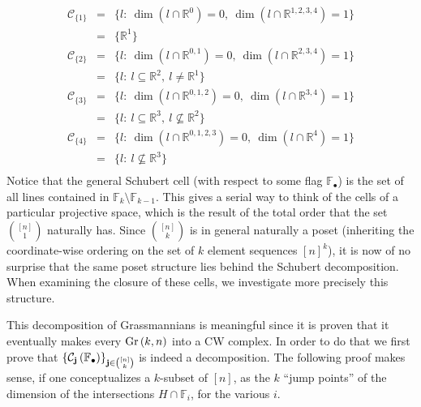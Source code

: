 \[\begin{array}{rcl}
\mathcal{C}_{\{1\}}&=&\big\{l:\ \dim(l\cap\mathbb{R}^{0})=0,\ \dim(l\cap\mathbb{R}^{1,2,3,4})=1\big\}\\
&=&\big\{\mathbb{R}^1\big\}\\[.6em]
\mathcal{C}_{\{2\}}&=&\big\{l:\ \dim(l\cap\mathbb{R}^{0,1})=0,\ \dim(l\cap\mathbb{R}^{2,3,4})=1\big\}\\
&=&\big\{l:\ l\subseteq\mathbb{R}^2,\ l\neq\mathbb{R}^1\big\}\\[.6em]
\mathcal{C}_{\{3\}}&=&\big\{l:\ \dim(l\cap\mathbb{R}^{0,1,2})=0,\ \dim(l\cap\mathbb{R}^{3,4})=1\big\}\\
&=&\big\{l:\ l\subseteq\mathbb{R}^3,\ l\not\subseteq\mathbb{R}^2\big\}\\[.6em]
\mathcal{C}_{\{4\}}&=&\big\{l:\ \dim(l\cap\mathbb{R}^{0,1,2,3})=0,\ \dim(l\cap\mathbb{R}^{4})=1\big\}\\
&=&\big\{l:\ l\not\subseteq\mathbb{R}^3\big\}\\[.6em]
\end{array}\]
Notice that the general Schubert cell (with respect to some flag $\mathbb{F}_{\bullet}$) is the set of all lines contained in $\mathbb{F}_k\setminus\mathbb{F}_{k-1}$.
This gives a serial way to think of the cells of a particular projective space, which is the result of the total order that the set $\binom{[n]}{1}$ naturally has. Since $\binom{[n]}{k}$ is in general naturally a poset (inheriting the coordinate-wise ordering on the set of $k$ element sequences ${[n]}^k$), it is now of no surprise that the same poset structure lies behind the Schubert decomposition.
When examining the closure of these cells, we investigate more precisely this structure.

This decomposition of Grassmannians is meaningful since it is proven that it eventually makes every $\Gr{k}{n}$ into a CW complex. In order to do that we first prove that
${\left\{\mathcal{C}_{\mathbf{j}}\left(\mathbb{F}_{\bullet}\right)\right\}}_{\mathbf{j}\in\binom{[n]}{k}}$ is indeed a decomposition. The following proof makes sense, if one conceptualizes a $k$-subset of $[n]$, as the $k$ ``jump points'' of the dimension of the intersections $H\cap\mathbb{F}_i$, for the various $i$.

